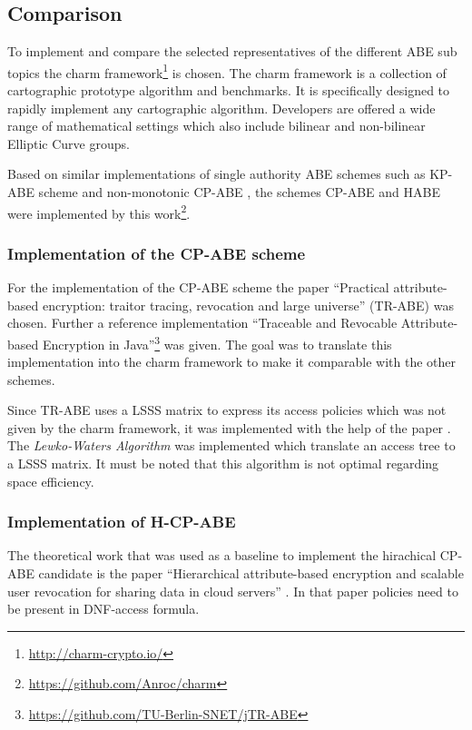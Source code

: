 \subsection{Comparison}
To implement and compare the selected representatives of the different ABE sub topics the charm framework\footnote{\url{http://charm-crypto.io/}} is chosen. The charm framework is a collection of cartographic prototype algorithm and benchmarks. It is specifically designed to rapidly implement any cartographic algorithm. Developers are offered a wide range of mathematical settings which also include bilinear and non-bilinear Elliptic Curve groups. 

Based on similar implementations of single authority ABE schemes such as \ac{KP-ABE} scheme \cite{lewko2010revocation} and non-monotonic \ac{CP-ABE} \cite{10.1007/978-3-642-54631-0_16}, the schemes \ac{CP-ABE} \cite{liu2016practical} and HABE \cite{wang2011hierarchical} were implemented  by this work\footnote{\url{https://github.com/Anroc/charm}}. 

\subsubsection{Implementation of the CP-ABE scheme}
For the implementation of the CP-ABE scheme the paper “Practical attribute-based encryption: traitor tracing, revocation and large universe” \cite{liu2016practical} (\ac{TR-ABE}) was chosen. Further a reference implementation “Traceable and Revocable Attribute-based Encryption in Java”\footnote{\url{https://github.com/TU-Berlin-SNET/jTR-ABE}} was given. The goal was to translate this implementation into the charm framework to make it comparable with the other schemes. 

Since TR-ABE uses a LSSS matrix to express its access policies which was not given by the charm framework, it was implemented with the help of the paper \cite{liu2010efficient}. The \textit{Lewko-Waters Algorithm} was implemented which translate an access tree to a LSSS matrix. It must be noted that this algorithm is not optimal regarding space efficiency. 

\subsubsection{Implementation of H-CP-ABE}
The theoretical work that was used as a baseline to implement the hirachical CP-ABE candidate is the paper “Hierarchical attribute-based encryption and scalable user revocation for sharing data in cloud servers” \cite{wang2011hierarchical}. In that paper policies need to be present in DNF-access formula. 

